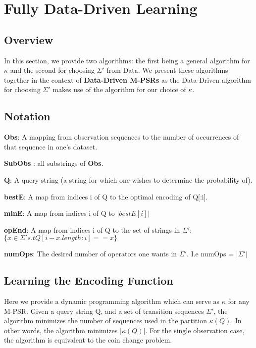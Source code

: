 \section{Fully Data-Driven Learning}

\subsection{Overview}

In this section, we provide two algorithms: the first being a general algorithm for $\kappa$ and the second for choosing $\Sigma'$ from Data. We present these algorithms together in the context of \textbf{Data-Driven M-PSRs} as the Data-Driven algorithm for choosing $\Sigma'$ makes use of the algorithm for our choice of $\kappa$.

\subsection{Notation}

\textbf{Obs}: A mapping from observation sequences to the number of occurrences of that sequence in one's dataset. 

\textbf{SubObs} : all substrings of \textbf{Obs}.

\textbf{Q}: A query string (a string for which one wishes to determine the probability of).

\textbf{bestE}: A map from indices i of Q to the optimal encoding of Q[:i].

\textbf{minE}: A map from indices i of Q to $|bestE[i]|$

\textbf{opEnd}: A map from indices i of Q to the set of strings in $\Sigma'$: $\{x \in \Sigma' s.t Q[i-x.length:i] == x\}$

\textbf{numOps}: The desired number of operators one wants in $\Sigma'$. I.e numOps =  $|\Sigma'|$

\subsection{Learning the Encoding Function}

Here we provide a dynamic programming algorithm which can serve as $\kappa$ for any M-PSR. Given a query string Q, and a set of transition sequences $\Sigma'$, the algorithm minimizes the number of sequences used in the partition $\kappa(Q)$. In other words, the algorithm minimizes $|\kappa(Q)|$. For the single observation case, the algorithm is equivalent to the coin change problem.

